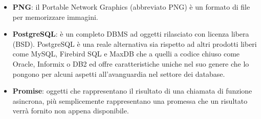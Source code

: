 \begin{itemize}
	\item
	\textbf{PNG}: il Portable Network Graphics (abbreviato PNG) è un formato di file per memorizzare immagini.
	\item
	\textbf{PostgreSQL}: è un completo DBMS ad oggetti rilasciato con licenza libera (BSD).
	PostgreSQL è una reale alternativa sia rispetto ad altri prodotti liberi come MySQL, Firebird SQL e MaxDB che a quelli a codice chiuso come Oracle, Informix o DB2 ed offre caratteristiche uniche nel suo genere che lo pongono per alcuni aspetti all'avanguardia nel settore dei database.
	\item
	\textbf{Promise}: oggetti che rappresentano il risultato di una chiamata di funzione asincrona, più semplicemente rappresentano una promessa che un risultato verrà fornito non appena disponibile.
\end{itemize}

